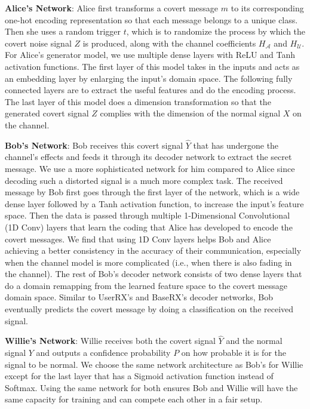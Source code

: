 \textbf{Alice's Network}: Alice first transforms a covert message \(m\) to its corresponding one-hot encoding representation so that each message belongs to a unique class. Then she uses a random trigger \(t\), which is to randomize the process by which the covert noise signal \(Z\) is produced, along with the channel coefficients \(H_{\mathcal{A}}\) and \(H_{\mathcal{U}}\). For Alice's generator model, we use multiple dense layers with ReLU and Tanh activation functions. The first layer of this model takes in the inputs and acts as an embedding layer by enlarging the input's domain space. The following fully connected layers are to extract the useful features and do the encoding process. The last layer of this model does a dimension transformation so that the generated covert signal \(Z\) complies with the dimension of the normal signal \(X\) on the channel. 


\textbf{Bob's Network}: Bob receives this covert signal \(\hat{Y}\) that has undergone the channel's effects and feeds it through its decoder network to extract the secret message. We use a more sophisticated network for him compared to Alice since decoding such a distorted signal is a much more complex task. The received message by Bob first goes through the first layer of the network, which is a wide dense layer followed by a Tanh activation function, to increase the input's feature space. Then the data is passed through multiple 1-Dimensional Convolutional (1D Conv) layers that learn the coding that Alice has developed to encode the covert messages. We find that using 1D Conv layers helps Bob and Alice achieving a better consistency in the accuracy of their communication, especially when the channel model is more complicated (i.e., when there is also fading in the channel). The rest of Bob's decoder network consists of two dense layers that do a domain remapping from the learned feature space to the covert message domain space. Similar to UserRX's and BaseRX's decoder networks, Bob eventually predicts the covert message by doing a classification on the received signal.


\textbf{Willie's Network}: Willie receives both the covert signal \(\hat{Y}\) and the normal signal \(Y\) and outputs a confidence probability \(P\) on how probable it is for the signal to be normal. We choose the same network architecture as Bob's for Willie except for the last layer that has a Sigmoid activation function instead of Softmax. Using the same network for both ensures Bob and Willie will have the same capacity for training and can compete each other in a fair setup.
